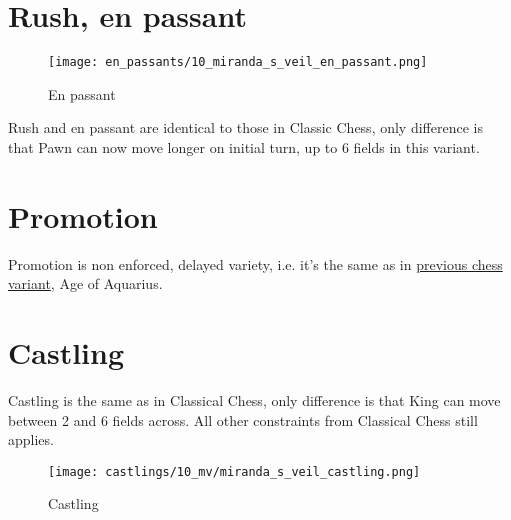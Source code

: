 \clearpage %

\section*{Rush, en passant}
\label{sec:Miranda's veil/Rush, en passant}

\noindent
\begin{wrapfigure}[5]{l}{0.4\textwidth}
\centering
\texttt{[image: en\_passants/10\_miranda\_s\_veil\_en\_passant.png]}
\caption{En passant}
\label{fig:10_miranda_s_veil_en_passant}
\end{wrapfigure}
Rush and en passant are identical to those in Classic Chess, only difference
is that Pawn can now move longer on initial turn, up to 6 fields in this
variant.


\vspace*{9.0\baselineskip}
\section*{Promotion}
\label{sec:Miranda's veil/Promotion}

Promotion is non enforced, delayed variety, i.e. it's the same as in
\hyperref[sec:Age of Aquarius/Promotion]{previous chess variant}, Age of Aquarius.

\clearpage %

\section*{Castling}
\label{sec:Miranda's veil/Castling}

Castling is the same as in Classical Chess, only difference is that King can move between 2 and 6 fields across.
All other constraints from Classical Chess still applies.

\vspace*{-0.7\baselineskip}
\noindent
\begin{figure}[!h]
\texttt{[image: castlings/10\_mv/miranda\_s\_veil\_castling.png]}
\caption{Castling}
\label{fig:miranda_s_veil_castling}
\end{figure}

